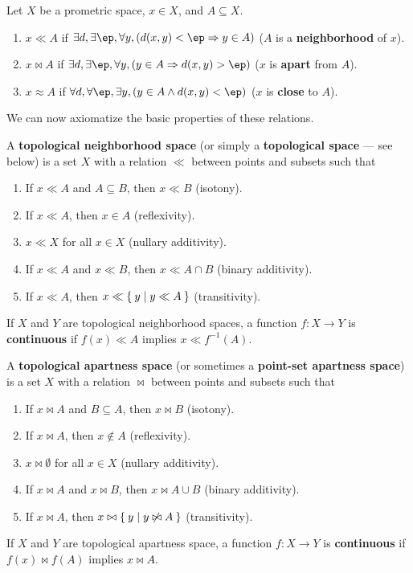 \documentclass{article}
\let\implies\Rightarrow
\def\inv{^{-1}}
\begin{document}
\begin{defn}\label{defn:toprels}
  Let $X$ be a prometric space, $x\in X$, and $A\subseteq X$.
  \begin{enumerate}
  \item $x\ll A$ if $\exists d, \exists \ep, \forall y, (d(x,y)<\ep \implies y\in A)$ ($A$ is a \textbf{neighborhood} of $x$).
  \item $x\bowtie A$ if $\exists d, \exists \ep, \forall y, (y\in A \implies d(x,y)>\ep)$ ($x$ is \textbf{apart} from $A$).
  \item $x\approx A$ if $\forall d, \forall \ep, \exists y, (y\in A \land d(x,y)<\ep)$ ($x$ is \textbf{close} to $A$).
  \end{enumerate}
\end{defn}

We can now axiomatize the basic properties of these relations.

\begin{defn}
  A \textbf{topological neighborhood space} (or simply a \textbf{topological space} --- see below) is a set $X$ with a relation $\ll$ between points and subsets such that
  \begin{enumerate}
  \item If $x\ll A$ and $A\subseteq B$, then $x\ll B$ (isotony).
  \item If $x\ll A$, then $x\in A$ (reflexivity).
  \item $x\ll X$ for all $x\in X$ (nullary additivity).
  \item If $x\ll A$ and $x\ll B$, then $x\ll A\cap B$ (binary additivity).
  \item If $x\ll A$, then $x \ll \Set{ y | y\ll A}$ (transitivity).
  \end{enumerate}
  If $X$ and $Y$ are topological neighborhood spaces, a function $f:X\to Y$ is \textbf{continuous} if $f(x)\ll A$ implies $x\ll f\inv(A)$.
\end{defn}

\begin{defn}
  A \textbf{topological apartness space} (or sometimes a \textbf{point-set apartness space}) is a set $X$ with a relation $\bowtie$ between points and subsets such that
  \begin{enumerate}
  \item If $x\bowtie A$ and $B\subseteq A$, then $x\bowtie B$ (isotony).
  \item If $x\bowtie A$, then $x\notin A$ (reflexivity).
  \item $x\bowtie \emptyset$ for all $x\in X$ (nullary additivity).
  \item If $x\bowtie A$ and $x\bowtie B$, then $x\bowtie A\cup B$ (binary additivity).
  \item If $x\bowtie A$, then $x\bowtie \Set{ y | y \not\bowtie A }$ (transitivity).
  \end{enumerate}
  If $X$ and $Y$ are topological apartness space, a function $f:X\to Y$ is \textbf{continuous} if $f(x)\bowtie f(A)$ implies $x\bowtie A$.
\end{defn}
\end{document}
